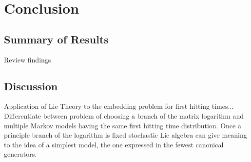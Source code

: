 \chapter{Conclusion}

\section{Summary of Results}
Review findings

\section{Discussion}
Application of Lie Theory to the embedding problem for first hitting times...
Differentiate between problem of choosing a branch of the matrix logarithm
and multiple Markov models having the same first hitting time distribution.
Once a principle branch of the logarithm is fixed stochastic Lie algebra can 
give meaning to the idea of a simplest model, the one expressed in the fewest 
canonical generators.